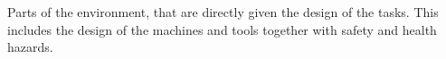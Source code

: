 \begin{definition} \label{def:working_environment} 
  Parts of the environment, that are directly given the design of the tasks. This includes the design of the machines and tools together with safety and health hazards. \cite[p. 27]{benyon14}
\end{definition}